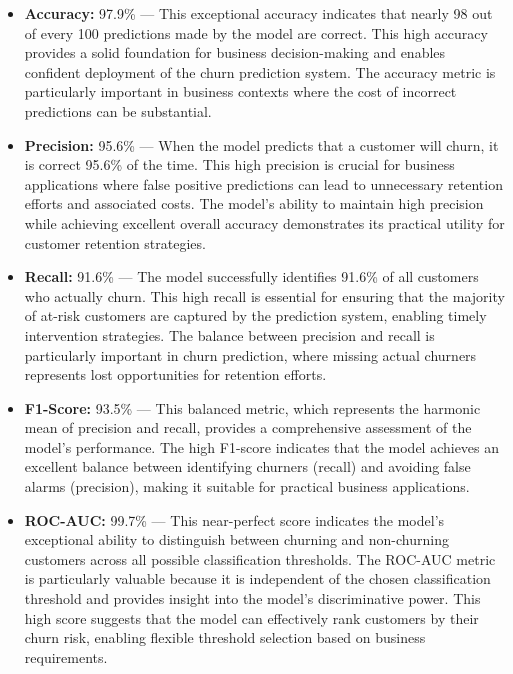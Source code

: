 \documentclass{article}
\begin{document}
\begin{itemize}
    \item \textbf{Accuracy:} 97.9\% — This exceptional accuracy indicates that nearly 98 out of every 100 predictions made by the model are correct. This high accuracy provides a solid foundation for business decision-making and enables confident deployment of the churn prediction system. The accuracy metric is particularly important in business contexts where the cost of incorrect predictions can be substantial.
    
    \item \textbf{Precision:} 95.6\% — When the model predicts that a customer will churn, it is correct 95.6\% of the time. This high precision is crucial for business applications where false positive predictions can lead to unnecessary retention efforts and associated costs. The model's ability to maintain high precision while achieving excellent overall accuracy demonstrates its practical utility for customer retention strategies.
    
    \item \textbf{Recall:} 91.6\% — The model successfully identifies 91.6\% of all customers who actually churn. This high recall is essential for ensuring that the majority of at-risk customers are captured by the prediction system, enabling timely intervention strategies. The balance between precision and recall is particularly important in churn prediction, where missing actual churners represents lost opportunities for retention efforts.
    
    \item \textbf{F1-Score:} 93.5\% — This balanced metric, which represents the harmonic mean of precision and recall, provides a comprehensive assessment of the model's performance. The high F1-score indicates that the model achieves an excellent balance between identifying churners (recall) and avoiding false alarms (precision), making it suitable for practical business applications.
    
    \item \textbf{ROC-AUC:} 99.7\% — This near-perfect score indicates the model's exceptional ability to distinguish between churning and non-churning customers across all possible classification thresholds. The ROC-AUC metric is particularly valuable because it is independent of the chosen classification threshold and provides insight into the model's discriminative power. This high score suggests that the model can effectively rank customers by their churn risk, enabling flexible threshold selection based on business requirements.
\end{itemize}
\end{document}
